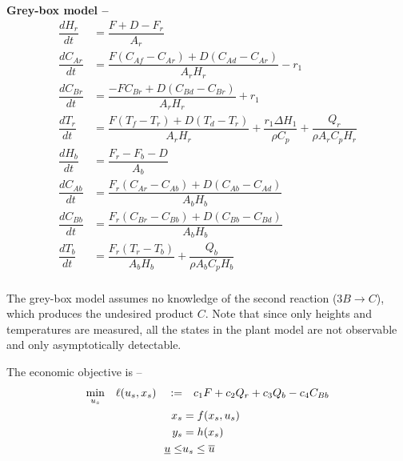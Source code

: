 \documentclass{article}
\begin{document}
\textbf{Grey-box model -- }
\begin{align*}
  \dfrac{dH_r}{dt} &= \dfrac{F + D -F_r}{A_r}\\
  \dfrac{dC_{Ar}}{dt} &= \dfrac{F(C_{Af} -C_{Ar}) + 
                         D(C_{Ad} -C_{Ar})}{A_rH_r} - r_1 \\
  \dfrac{dC_{Br}}{dt} &= \dfrac{-FC_{Br} + 
                          D(C_{Bd} -C_{Br})}{A_rH_r} + r_1\\
  \dfrac{dT_r}{dt} &= \dfrac{F(T_f - T_r) + D(T_d -T_r)}{A_rH_r} + 
                      \dfrac{r_1\Delta H_1}{\rho C_p} + 
                      \dfrac{Q_r}{\rho A_r C_p H_r}\\
  \dfrac{dH_b}{dt} &= \dfrac{F_r - F_b - D}{A_b} \\
  \dfrac{dC_{Ab}}{dt} &= \dfrac{F_r(C_{Ar} -C_{Ab}) + 
                          D(C_{Ab} -C_{Ad})}{A_bH_b} \\
  \dfrac{dC_{Bb}}{dt} &= \dfrac{F_r(C_{Br} -C_{Bb}) + 
                          D(C_{Bb} -C_{Bd})}{A_bH_b} \\
  \dfrac{dT_b}{dt} &= \dfrac{F_r(T_r - T_b)}{A_bH_b} +
                      \dfrac{Q_b}{\rho A_b C_p H_b}\\
\end{align*}

The grey-box model assumes no knowledge of the second 
reaction ($3B \rightarrow C$), which produces the undesired 
product $C$. Note that since only heights and temperatures are 
measured, all the states in the plant model are 
not observable and only asymptotically detectable. 

The economic objective is -- 
\begin{align*}
  \underset{u_s}{\textnormal{min}} \quad 
  \ell(u_s, x_s) \quad := & \quad c_1F + c_2Q_r + 
                                      c_3Q_b - c_4C_{Bb} \\
  x_s &= f(x_s, u_s)\\ 
  y_s &= h(x_s) \\
  \underline{u} \leq &u_s \leq \overline{u}
\end{align*}
\end{document}

